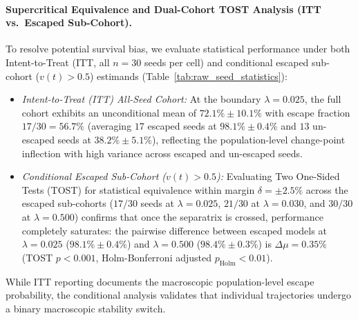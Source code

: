 \documentclass{article}
\theoremstyle{plain}
\theoremstyle{definition}
\begin{document}
\paragraph{Supercritical Equivalence and Dual-Cohort TOST Analysis (ITT vs.\ Escaped Sub-Cohort).}
To resolve potential survival bias, we evaluate statistical performance under both Intent-to-Treat (ITT, all $n=30$ seeds per cell) and conditional escaped sub-cohort ($v(t) > 0.5$) estimands (Table~\ref{tab:raw_seed_statistics}):
\begin{itemize}[noitemsep]
    \item \emph{Intent-to-Treat (ITT) All-Seed Cohort:} At the boundary $\lambda = 0.025$, the full cohort exhibits an unconditional mean of $72.1\% \pm 10.1\%$ with escape fraction $17/30 = 56.7\%$ (averaging $17$ escaped seeds at $98.1\% \pm 0.4\%$ and $13$ un-escaped seeds at $38.2\% \pm 5.1\%$), reflecting the population-level change-point inflection with high variance across escaped and un-escaped seeds.
    \item \emph{Conditional Escaped Sub-Cohort ($v(t) > 0.5$):} Evaluating Two One-Sided Tests (TOST) for statistical equivalence within margin $\delta = \pm 2.5\%$ across the escaped sub-cohorts ($17/30$ seeds at $\lambda = 0.025$, $21/30$ at $\lambda = 0.030$, and $30/30$ at $\lambda = 0.500$) confirms that once the separatrix is crossed, performance completely saturates: the pairwise difference between escaped models at $\lambda = 0.025$ ($98.1\% \pm 0.4\%$) and $\lambda = 0.500$ ($98.4\% \pm 0.3\%$) is $\Delta \mu = 0.35\%$ (TOST $p < 0.001$, Holm-Bonferroni adjusted $p_{\text{Holm}} < 0.01$).
\end{itemize}
While ITT reporting documents the macroscopic population-level escape probability, the conditional analysis validates that individual trajectories undergo a binary macroscopic stability switch.
\end{document}
